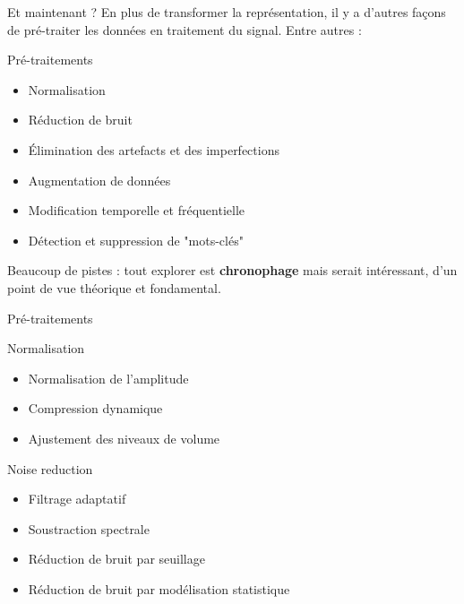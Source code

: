 \documentclass[compress,xcolor=table]{beamer}
\begin{document}
\begin{frame}{Et maintenant ?}
    En plus de transformer la représentation, il y a d'autres façons de pré-traiter les données en traitement du signal. Entre autres :

    \begin{block}{Pré-traitements}
        \begin{itemize}
            \item Normalisation
            \item Réduction de bruit
            \item Élimination des artefacts et des imperfections
            \item Augmentation de données
            \item Modification temporelle et fréquentielle
            \item Détection et suppression de "mots-clés"
        \end{itemize}
    \end{block}

    Beaucoup de pistes : tout explorer est \textbf{chronophage} mais serait intéressant, d'un point de vue théorique et fondamental.

\end{frame}

\begin{frame}{Pré-traitements}

    \begin{exampleblock}{Normalisation}
        \begin{itemize}
            \item Normalisation de l'amplitude
            \item Compression dynamique
            \item Ajustement des niveaux de volume
        \end{itemize}
    \end{exampleblock}

    \begin{exampleblock}{Noise reduction}
        \begin{itemize}
            \item Filtrage adaptatif
            \item Soustraction spectrale
            \item Réduction de bruit par seuillage
            \item Réduction de bruit par modélisation statistique
        \end{itemize}
    \end{exampleblock}

\end{frame}
\end{document}
